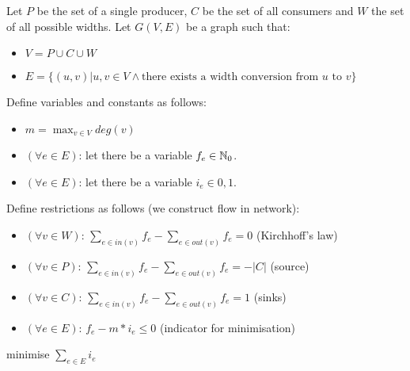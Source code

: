 Let $P$ be the set of a single producer, $C$ be the set of all consumers and $W$ the set of all possible widths. Let $G(V,E)$ be a graph such that:
\begin{itemize}
  \item $V = P \cup C \cup W$
  \item $E = \{ (u,v) | u,v \in V \land \text{there exists a width conversion from } u \text{ to } v \}$
\end{itemize}
Define variables and constants as follows:
\begin{itemize}
\item $m = \max_{v \in V}deg(v)$
\item $(\forall e \in E)$: let there be a variable $f_e \in \mathbb{N}_0$.
\item $(\forall e \in E)$: let there be a variable $i_e \in {0,1}$.
\end{itemize}
Define restrictions as follows (we construct flow in network):
\begin{itemize}
\item $(\forall v \in W)$: $\sum_{e \in in(v)} f_e - \sum_{e\in out(v)} f_e = 0$ (Kirchhoff's law)
\item $(\forall v \in P)$: $\sum_{e \in in(v)} f_e - \sum_{e\in out(v)} f_e = - | C |$ (source)
\item $(\forall v \in C)$: $\sum_{e \in in(v)} f_e - \sum_{e\in out(v)} f_e = 1$ (sinks)
\item $(\forall e \in E)$: $f_e - m*i_e \leq 0$ (indicator for minimisation)
\end{itemize}
minimise $\sum_{e \in E} i_e$

